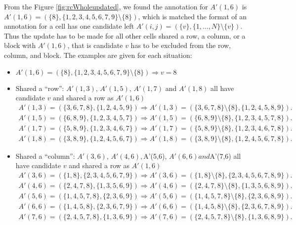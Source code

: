 \documentclass[11pt]{report}
\newcommand{\set}[1]{\{ #1 \}}
\begin{document}
From the Figure \ref{fig:rcWholeupdated}, we found the annotation for $A'(1,6)$ is $A'(1,6) =(\set{8}, \set{1, 2, 3, 4, 5, 6, 7, 9} \setminus \set{8})$, which is matched the format of an annotation for a cell has one candidate left $A'(i,j) =(\set{v}, \set{1,\dots,N} \setminus \set{v})$. Thus the update has to be made for all other cells shared a row, a column, or a block with $A'(1,6)$, that is candidate $v$ has to be excluded from the row, column, and block. The examples are given for each situation:
\begin{itemize}
\item $A'(1,6) =(\set{8}, \set{1, 2, 3, 4, 5, 6, 7, 9} \setminus \set{8}) \Rightarrow v = 8$
\item Shared a ``row'': $A'(1,3)$, $A'(1,5)$, $A'(1,7)$ and $A'(1,8)$ all have candidate $v$ and shared a row as $A'(1,6)$
\begin{eqnarray*}
A'(1,3) =(\set{3, 6, 7, 8}, \set{1, 2, 4, 5, 9})\Rightarrow A'(1,3) =(\set{3, 6, 7, 8}\setminus \set{8}, \set{1, 2, 4, 5, 8, 9}).\\
A'(1,5) =(\set{6, 8, 9}, \set{1, 2, 3, 4, 5, 7})\Rightarrow A'(1,5) =(\set{6, 8, 9}\setminus \set{8}, \set{1, 2, 3, 4, 5, 7, 8}).\\
A'(1,7) =(\set{5, 8, 9}, \set{1, 2, 3, 4, 6, 7})\Rightarrow A'(1,7) =(\set{5, 8, 9}\setminus \set{8}, \set{1, 2, 3, 4, 6, 7, 8}).\\
A'(1,8) =(\set{3, 8, 9}, \set{1, 2, 4, 5, 6, 7})\Rightarrow A'(1,8) =(\set{3, 8, 9}\setminus \set{8}, \set{1, 2, 4, 5, 6, 7, 8}).
\end{eqnarray*}
\item Shared a ``column'': $A'(3,6)$, $A'(4,6), $A'(5,6), $A'(6,6) and $A'(7,6) all have candidate $v$ and shared a row as $A'(1,6)$
\begin{eqnarray*}
A'(3,6) =(\set{1, 8}, \set{2, 3, 4, 5, 6, 7, 9})\Rightarrow A'(3,6) =(\set{1, 8}\setminus \set{8}, \set{2, 3, 4, 5, 6, 7, 8, 9}).\\
A'(4,6) =(\set{2, 4, 7, 8}, \set{1, 3, 5, 6, 9})\Rightarrow A'(4,6) =(\set{2, 4, 7, 8}\setminus \set{8}, \set{1, 3, 5, 6, 8, 9}).\\
A'(5,6) =(\set{1, 4, 5, 7, 8}, \set{2, 3, 6, 9})\Rightarrow A'(5,6) =(\set{1, 4, 5, 7, 8}\setminus \set{8}, \set{2, 3, 6, 8, 9}).\\
A'(6,6) =(\set{1, 4, 5, 8}, \set{2, 3, 6, 7, 9})\Rightarrow A'(6,6) =(\set{1, 4, 5, 8}\setminus \set{8}, \set{2, 3, 6, 7, 8, 9}).\\
A'(7,6) =(\set{2, 4, 5, 7, 8}, \set{1, 3, 6, 9})\Rightarrow A'(7,6) =(\set{2, 4, 5, 7, 8}\setminus \set{8}, \set{1, 3, 6, 8, 9}).\\

\end{eqnarray*}
\end{itemize}
\end{document}
